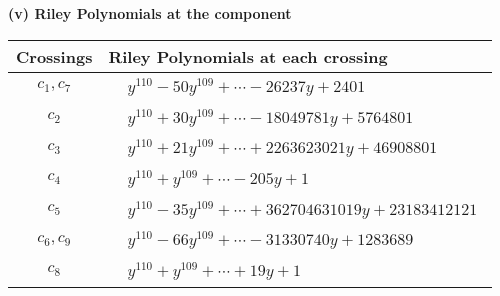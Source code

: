 \documentclass[1p]{elsarticle_modified}
\theoremstyle{definition}
\begin{document}
\newpage\renewcommand{\arraystretch}{1}
\flushleft \textbf{(v) Riley Polynomials at the component}\newline \\
\begin{tabular}{m{50pt}|m{274pt}}
Crossings & \hspace{64pt}Riley Polynomials at each crossing \\
\hline $$\begin{aligned}c_{1},c_{7}\end{aligned}$$&$\begin{aligned}
&y^{110}-50 y^{109}+\cdots-26237 y+2401
\end{aligned}$\\
\hline $$\begin{aligned}c_{2}\end{aligned}$$&$\begin{aligned}
&y^{110}+30 y^{109}+\cdots-18049781 y+5764801
\end{aligned}$\\
\hline $$\begin{aligned}c_{3}\end{aligned}$$&$\begin{aligned}
&y^{110}+21 y^{109}+\cdots+2263623021 y+46908801
\end{aligned}$\\
\hline $$\begin{aligned}c_{4}\end{aligned}$$&$\begin{aligned}
&y^{110}+y^{109}+\cdots-205 y+1
\end{aligned}$\\
\hline $$\begin{aligned}c_{5}\end{aligned}$$&$\begin{aligned}
&y^{110}-35 y^{109}+\cdots+362704631019 y+23183412121
\end{aligned}$\\
\hline $$\begin{aligned}c_{6},c_{9}\end{aligned}$$&$\begin{aligned}
&y^{110}-66 y^{109}+\cdots-31330740 y+1283689
\end{aligned}$\\
\hline $$\begin{aligned}c_{8}\end{aligned}$$&$\begin{aligned}
&y^{110}+y^{109}+\cdots+19 y+1
\end{aligned}$\\

\end{tabular}
\end{document}
